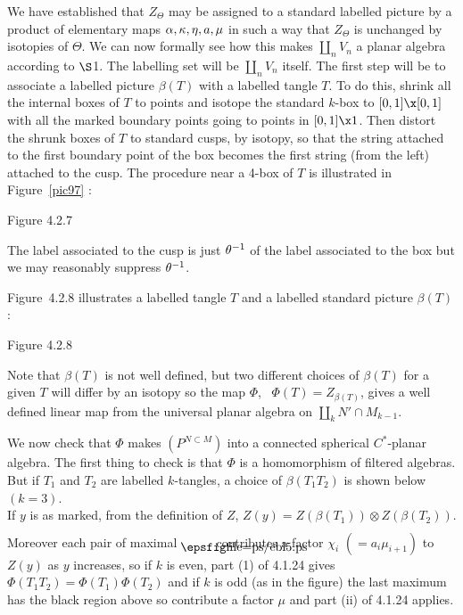 We have established that $Z_{\Theta}$ may be assigned to a standard
labelled picture by a product of elementary maps $\alpha, \kappa,
\eta,a,\mu$ in such a way that $Z_{\Theta}$ is unchanged by isotopies
of $\Theta$. We can now formally see how this makes $\coprod_n V_n$
a planar algebra according to $\S$1. The labelling set will be
$\coprod_n V_n$ itself.  The first step will be to associate a
labelled picture $\beta(T)$ with a labelled tangle $T$. To do this,
shrink all the internal boxes of $T$ to points and  isotope the
standard $k$-box to $[0,1]\x [0,1]$ with all the marked boundary
points going to points in $[0,1]\x 1$. Then distort the shrunk
boxes of $T$ to standard cusps, by isotopy, so that the string
attached to the first boundary point of the box becomes the first
string (from the left) attached to the cusp. The procedure near a
4-box of $T$ is illustrated in Figure~\ref{pic97} :
\[
        
\]
\begin{center}
	Figure 4.2.7
\end{center}
\bs\ni The label associated to the cusp is just $\theta^{-1}$ of the
label associated to the box but we may reasonably suppress
$\theta^{-1}$.

Figure~4.2.8 illustrates a labelled tangle $T$ and a labelled
standard picture $\beta(T)$:
\[
        
\]
\begin{center}
	Figure 4.2.8
\end{center}

\bs\ni Note that $\beta(T)$ is not well defined, but two different
choices of $\beta(T)$ for a given $T$ will differ by an isotopy so
the map $\Phi$, \ $\Phi(T)=Z_{\beta(T)}$, gives a well defined
linear map from the universal planar algebra on $\coprod_k N'\cap
M_{k-1}$.

We now check that $\Phi$ makes $(P^{N\subset M})$ into a
connected spherical $C^*$-planar algebra. The first thing to check
is that
$\Phi$ is a homomorphism of filtered algebras. But if $T_1$ and
$T_2$ are labelled $k$-tangles, a choice of $\beta(T_1T_2)$ is
shown below $(k=3)$.
\[
        
\]
\ni If $y$ is as marked, from the definition of $Z$,
$Z(y)=Z(\beta(T_1))\otimes Z(\beta(T_2))$. Moreover each pair of
maximal $\bnd$ \hskip8pt  contributes a factor $\chi_i$
$(=a_i\mu_{i+1})$ to $Z(y)$ as $y$ increases, so if $k$ is even,
part (1) of 4.1.24 gives $\Phi(T_1T_2)=\Phi(T_1)\Phi(T_2)$ and if
$k$ is odd (as in the figure) the last maximum has the black
region above so contribute a factor $\mu$ and part (ii) of 4.1.24
applies.

